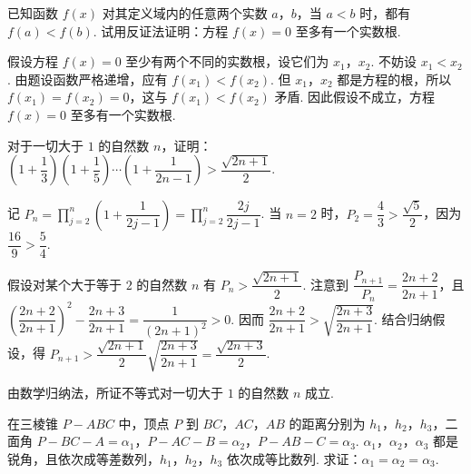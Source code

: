 \documentclass[UTF8,a4paper,oneside,11pt]{ctexbook}
\begin{document}
\begin{problem}

已知函数 \(f(x)\) 对其定义域内的任意两个实数 \(a\)，\(b\)，当 \(a<b\) 时，都有 \(f(a)<f(b)\). 试用反证法证明：方程 \(f(x)=0\) 至多有一个实数根.
\end{problem}

\begin{solution}
假设方程 \(f(x)=0\) 至少有两个不同的实数根，设它们为 \(x_1\)，\(x_2\). 不妨设 \(x_1<x_2\). 由题设函数严格递增，应有 \(f(x_1)<f(x_2)\). 但 \(x_1\)，\(x_2\) 都是方程的根，所以 \(f(x_1)=f(x_2)=0\)，这与 \(f(x_1)<f(x_2)\) 矛盾. 因此假设不成立，方程 \(f(x)=0\) 至多有一个实数根.
\end{solution}

\begin{problem}

对于一切大于 \(1\) 的自然数 \(n\)，证明：\(\left(1+\dfrac{1}{3}\right)\left(1+\dfrac{1}{5}\right)\cdots\left(1+\dfrac{1}{2n-1}\right)>\dfrac{\sqrt{2n+1}}{2}\).
\end{problem}

\begin{solution}
记 \(P_n=\displaystyle\prod_{j=2}^{n}\left(1+\dfrac{1}{2j-1}\right)=\prod_{j=2}^{n}\dfrac{2j}{2j-1}\). 当 \(n=2\) 时，\(P_2=\dfrac43>\dfrac{\sqrt5}{2}\)，因为 \(\dfrac{16}{9}>\dfrac54\).

假设对某个大于等于 \(2\) 的自然数 \(n\) 有 \(P_n>\dfrac{\sqrt{2n+1}}{2}\). 注意到
\(\dfrac{P_{n+1}}{P_n}=\dfrac{2n+2}{2n+1}\)，且
\(\left(\dfrac{2n+2}{2n+1}\right)^2-\dfrac{2n+3}{2n+1}=\dfrac{1}{(2n+1)^2}>0\). 因而 \(\dfrac{2n+2}{2n+1}>\sqrt{\dfrac{2n+3}{2n+1}}\). 结合归纳假设，得
\(P_{n+1}>\dfrac{\sqrt{2n+1}}{2}\sqrt{\dfrac{2n+3}{2n+1}}=\dfrac{\sqrt{2n+3}}{2}\).

由数学归纳法，所证不等式对一切大于 \(1\) 的自然数 \(n\) 成立.
\end{solution}

\begin{problem}

在三棱锥 \(P-ABC\) 中，顶点 \(P\) 到 \(BC\)，\(AC\)，\(AB\) 的距离分别为 \(h_1\)，\(h_2\)，\(h_3\)，二面角 \(P-BC-A=\alpha_1\)，\(P-AC-B=\alpha_2\)，\(P-AB-C=\alpha_3\). \(\alpha_1\)，\(\alpha_2\)，\(\alpha_3\) 都是锐角，且依次成等差数列，\(h_1\)，\(h_2\)，\(h_3\) 依次成等比数列. 求证：\(\alpha_1=\alpha_2=\alpha_3\).
\end{problem}
\end{document}
